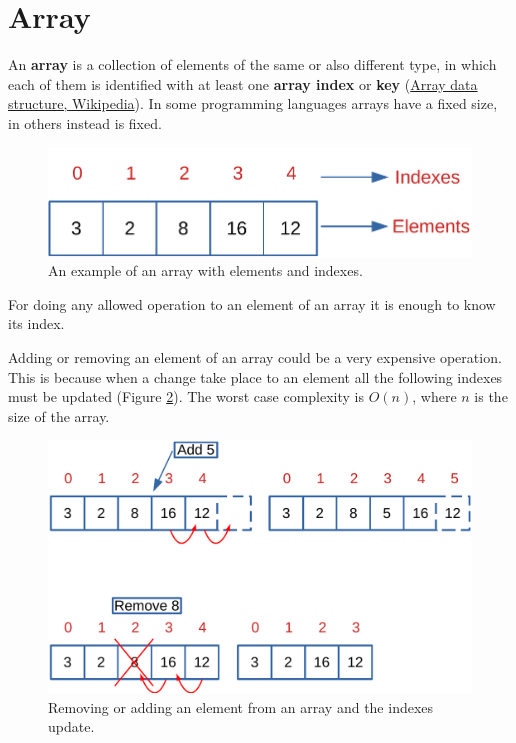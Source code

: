 \section{Array}
An \textbf{array} is a collection of elements of the same or also different type, in which each of them is identified with at least one \textbf{array index} or \textbf{key} \cite{wikiarray} (\href{https://en.wikipedia.org/wiki/Array_data_structure}{Array data structure, Wikipedia}). In some programming languages arrays have a fixed size, in others instead is fixed.
\begin{figure}[H]
	\begin{center}
		\includegraphics[scale=0.6]{chapters/datastructures/images/array_1.pdf}
		\caption[An example of an array with elements and indexes.]{An example of an array with elements and indexes.}
		\label{array_1}
	\end{center}
\end{figure}

For doing any allowed operation to an element of an array it is enough to know its index. 

Adding or removing an element of an array could be a very expensive operation. This is because when a change take place to an element all the following indexes must be updated (Figure \ref{array_2}). The worst case complexity is \(O(n)\), where \(n\) is the size of the array.
\begin{figure}[H]
	\begin{center}
		\includegraphics[scale=.6]{chapters/datastructures/images/array_2.pdf}
		\caption[Removing or adding an element from an array and the indexes update.]{Removing or adding an element from an array and the indexes update.}
		\label{array_2}
	\end{center}
\end{figure}

